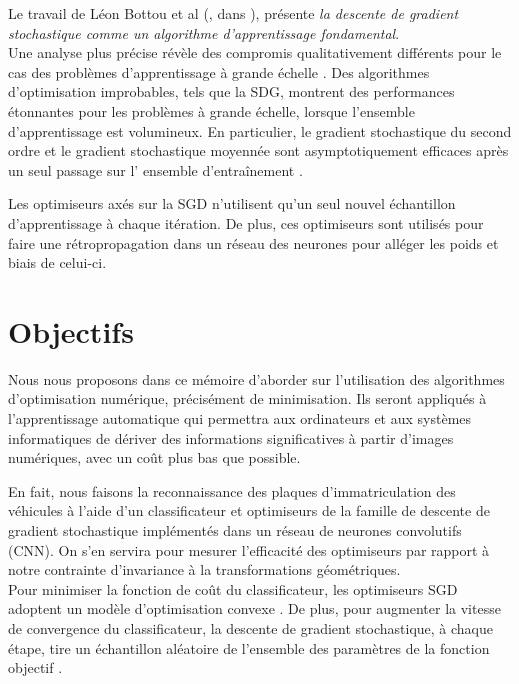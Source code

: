 		Le travail de Léon Bottou et al (\eg, dans \cite{bottou2010large} \cite{wijnhoven2010fast} \cite{bottou2012stochastic} ), présente \textit{la descente de gradient stochastique comme un algorithme d'apprentissage fondamental}.\\
		Une analyse plus précise révèle des compromis qualitativement différents pour le cas des problèmes d'apprentissage à grande échelle \cite{bottou2018optimization}. Des algorithmes d'optimisation improbables, tels que la SDG, montrent des performances étonnantes pour les problèmes à grande échelle, lorsque l'ensemble d'apprentissage est volumineux. En particulier, le gradient stochastique du second ordre et le gradient stochastique moyennée sont asymptotiquement efficaces après un seul passage sur l' ensemble d'entraînement \cite{bottou2010large}. 
		
		Les optimiseurs axés sur la SGD n'utilisent qu'un seul nouvel échantillon d'apprentissage à chaque itération. De plus, ces optimiseurs sont utilisés pour faire une rétropropagation dans un réseau des neurones pour alléger les poids et biais de celui-ci.
		
		
			
	
	\section{Objectifs}
		
		Nous nous proposons dans ce mémoire d'aborder sur l'utilisation des algorithmes d'optimisation numérique, précisément de minimisation. Ils seront appliqués à l'apprentissage automatique qui permettra aux ordinateurs et aux systèmes informatiques de dériver des informations significatives à partir d'images numériques, avec un coût plus bas que possible.
		
		En fait, nous faisons la reconnaissance des plaques d’immatriculation des véhicules à l'aide d’un classificateur et optimiseurs de la famille de descente de gradient stochastique implémentés dans un réseau de neurones convolutifs (CNN). On s’en servira pour mesurer l'efficacité des optimiseurs par rapport à notre contrainte d’invariance à la transformations géométriques.\\
		Pour minimiser la fonction de coût du classificateur, les optimiseurs SGD adoptent un modèle d'optimisation convexe \cite{deepa2021ai}. De plus, pour augmenter la vitesse de convergence du classificateur, la descente de gradient stochastique, à chaque étape, tire un échantillon aléatoire de l'ensemble des paramètres de la fonction objectif \cite{bottou2018optimization}.
		
